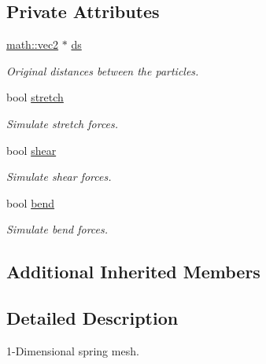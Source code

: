 \subsection*{Private Attributes}
\begin{DoxyCompactItemize}
\item 
\hyperlink{structphysim_1_1math_1_1vec2}{math\+::vec2} $\ast$ \hyperlink{classphysim_1_1meshes_1_1mesh1d_a9f185406b79496adfb33947591620ddf}{ds}
\begin{DoxyCompactList}\small\item\em Original distances between the particles. \end{DoxyCompactList}\item 
\mbox{\label{classphysim_1_1meshes_1_1mesh1d_a2c5233fc91df5ae5ac41759e4d8419da}} 
bool \hyperlink{classphysim_1_1meshes_1_1mesh1d_a2c5233fc91df5ae5ac41759e4d8419da}{stretch}
\begin{DoxyCompactList}\small\item\em Simulate stretch forces. \end{DoxyCompactList}\item 
\mbox{\label{classphysim_1_1meshes_1_1mesh1d_a941f796d30c2204e3aa995e984063355}} 
bool \hyperlink{classphysim_1_1meshes_1_1mesh1d_a941f796d30c2204e3aa995e984063355}{shear}
\begin{DoxyCompactList}\small\item\em Simulate shear forces. \end{DoxyCompactList}\item 
\mbox{\label{classphysim_1_1meshes_1_1mesh1d_a93d3f9fb656f309bf884333bafa9383e}} 
bool \hyperlink{classphysim_1_1meshes_1_1mesh1d_a93d3f9fb656f309bf884333bafa9383e}{bend}
\begin{DoxyCompactList}\small\item\em Simulate bend forces. \end{DoxyCompactList}\end{DoxyCompactItemize}
\subsection*{Additional Inherited Members}


\subsection{Detailed Description}
1-\/\+Dimensional spring mesh. 

